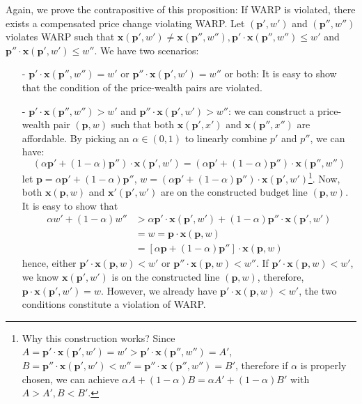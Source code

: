 \begin{description}
    Again, we prove the contrapositive of this proposition: If WARP is violated, there exists a compensated price change violating WARP. Let $(\mathbf{p}',w')$ and $(\mathbf{p}'',w'')$ violates WARP such that $\mathbf{x}(\mathbf{p}',w')\neq \mathbf{x}(\mathbf{p}'',w''),\mathbf{p}'\cdot\mathbf{x}(\mathbf{p}'',w'')\leq w'$ and $\mathbf{p}''\cdot\mathbf{x}(\mathbf{p}',w')\leq w''$. We have two scenarios:
    \begin{enumerate}
        \item[-] $\mathbf{p}'\cdot\mathbf{x}(\mathbf{p}'',w'')= w'$ or $\mathbf{p}''\cdot\mathbf{x}(\mathbf{p}',w')= w''$ or both: It is easy to show that the condition of the price-wealth pairs are violated.
        \item[-] $\mathbf{p}'\cdot\mathbf{x}(\mathbf{p}'',w'')> w'$ and $\mathbf{p}''\cdot\mathbf{x}(\mathbf{p}',w')>w''$: we can construct a price-wealth pair $(\mathbf{p},w)$ such that both $\mathbf{x}(\mathbf{p}',x')$ and $\mathbf{x}(\mathbf{p}'',x'')$ are affordable. By picking an $\alpha \in (0,1)$ to linearly combine $p'$ and $p''$, we can have:
        $$(\alpha \mathbf{p}'+(1-\alpha)\mathbf{p}'')\cdot \mathbf{x}(\mathbf{p}',w')= (\alpha \mathbf{p}'+(1-\alpha)\mathbf{p}'')\cdot \mathbf{x}(\mathbf{p}'',w'')$$
        let $\mathbf{p}=\alpha \mathbf{p}'+(1-\alpha)\mathbf{p}''$, $w=(\alpha \mathbf{p}'+(1-\alpha)\mathbf{p}'')\cdot \mathbf{x}(\mathbf{p}',w')$\footnote{Why this construction works? Since $A = \mathbf{p}'\cdot \mathbf{x}(\mathbf{p}',w')= w'> \mathbf{p}'\cdot \mathbf{x}(\mathbf{p}'',w'')=A'$, $B=\mathbf{p}''\cdot \mathbf{x}(\mathbf{p}',w')<w''= \mathbf{p}''\cdot \mathbf{x}(\mathbf{p}'',w'')=B'$, therefore if $\alpha$ is properly chosen, we can achieve $\alpha A+(1-\alpha)B = \alpha A'+(1-\alpha) B'$ with $A>A',B<B'$.}.
         Now, both $\mathbf{x}(\mathbf{p},w)$ and $\mathbf{x}'(\mathbf{p}',w')$ are on the constructed budget line $(\mathbf{p},w)$. It is easy to show that
        \begin{align*}
            \alpha w'+(1-\alpha)w'' &> \alpha \mathbf{p}'\cdot\mathbf{x}(\mathbf{p}',w')+(1-\alpha) \mathbf{p}''\cdot \mathbf{x}(\mathbf{p}',w') \\
            & = w=\mathbf{p}\cdot \mathbf{x}(\mathbf{p},w)\\
            & = \left[ \alpha \mathbf{p}+(1-\alpha) \mathbf{p}''\right]\cdot \mathbf{x}(\mathbf{p},w)
        \end{align*}
        hence, either $\mathbf{p}'\cdot \mathbf{x}(\mathbf{p},w)<w'$ or $\mathbf{p}''\cdot \mathbf{x}(\mathbf{p},w)<w''$. If $\mathbf{p}'\cdot\mathbf{x}(\mathbf{p},w)<w'$, we know $\mathbf{x}(\mathbf{p}',w')$ is on the constructed line $(\mathbf{p},w)$, therefore, $\mathbf{p}\cdot \mathbf{x}(\mathbf{p}',w')=w$. However, we already have $\mathbf{p}'\cdot \mathbf{x}(\mathbf{p},w)<w'$, the two conditions constitute a violation of WARP.
    \end{enumerate} 


\end{description}
